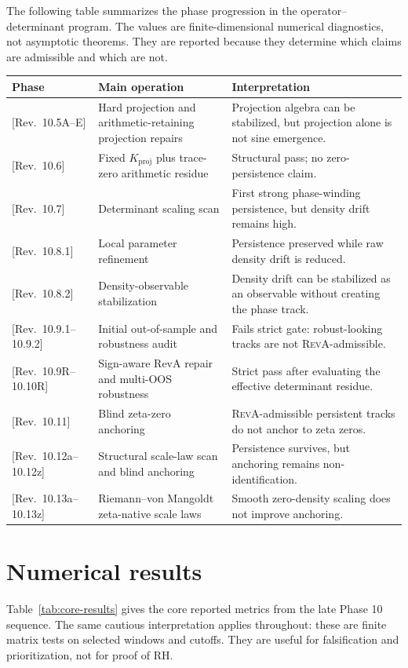 \documentclass[11pt]{article}
\newcommand{\RevA}{\textsc{RevA}}
\newcommand{\Kproj}{K_{\mathrm{proj}}}
\newcommand{\revtag}[1]{\textnormal{[Rev.~#1]}}
\theoremstyle{definition}
\theoremstyle{plain}
\begin{document}
The following table summarizes the phase progression in the operator--determinant program.  The values are finite-dimensional numerical diagnostics, not asymptotic theorems.  They are reported because they determine which claims are admissible and which are not.

\begin{longtable}{p{}p{}p{}}
\toprule
Phase & Main operation & Interpretation \\
\midrule
\revtag{10.5A--E} & Hard projection and arithmetic-retaining projection repairs & Projection algebra can be stabilized, but projection alone is not sine emergence. \\
\revtag{10.6} & Fixed $\Kproj$ plus trace-zero arithmetic residue & Structural pass; no zero-persistence claim. \\
\revtag{10.7} & Determinant scaling scan & First strong phase-winding persistence, but density drift remains high. \\
\revtag{10.8.1} & Local parameter refinement & Persistence preserved while raw density drift is reduced. \\
\revtag{10.8.2} & Density-observable stabilization & Density drift can be stabilized as an observable without creating the phase track. \\
\revtag{10.9.1--10.9.2} & Initial out-of-sample and robustness audit & Fails strict gate: robust-looking tracks are not \RevA-admissible. \\
\revtag{10.9R--10.10R} & Sign-aware RevA repair and multi-OOS robustness & Strict pass after evaluating the effective determinant residue. \\
\revtag{10.11} & Blind zeta-zero anchoring & \RevA-admissible persistent tracks do not anchor to zeta zeros. \\
\revtag{10.12a--10.12z} & Structural scale-law scan and blind anchoring & Persistence survives, but anchoring remains non-identification. \\
\revtag{10.13a--10.13z} & Riemann--von Mangoldt zeta-native scale laws & Smooth zero-density scaling does not improve anchoring. \\
\bottomrule
\end{longtable}

\section{Numerical results}

Table~\ref{tab:core-results} gives the core reported metrics from the late Phase 10 sequence.  The same cautious interpretation applies throughout: these are finite matrix tests on selected windows and cutoffs.  They are useful for falsification and prioritization, not for proof of RH.
\end{document}
